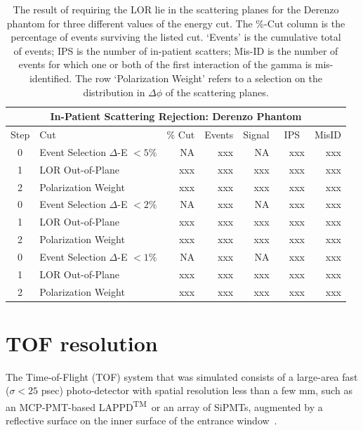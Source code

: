 \documentclass[12pt]{article}
\def\LAPPDTM{LAPPD\textsuperscript{TM}~}
\begin{document}
\begin{table}[h]
\centering
\begin{tabular}{|c|l|r|r|r|r|r|}
\hline\hline
\multicolumn{7}{|c|}{\bf In-Patient Scattering Rejection: Derenzo Phantom}\\
\hline \hline
Step & Cut & $\%$ Cut & Events & Signal & ~IPS~ & MisID \\
\hline
0 & Event Selection  $\Delta$-E $<5\%$ & NA  & xxx & NA  & xxx & xxx \\
1 & LOR Out-of-Plane & xxx & xxx     & xxx & xxx & xxx \\
2 & Polarization Weight & xxx & xxx     & xxx & xxx & xxx \\
\hline
0 & Event Selection  $\Delta$-E $<2\%$ & NA  & xxx & NA  & xxx & xxx \\
1 & LOR Out-of-Plane& xxx & xxx     & xxx & xxx & xxx \\
2 & Polarization Weight & xxx & xxx     & xxx & xxx & xxx \\
\hline
0 & Event Selection  $\Delta$-E $<1\%$ & NA  & xxx & NA  & xxx & xxx \\
1 & LOR Out-of-Plane& xxx & xxx     & xxx & xxx & xxx \\
2 & Polarization Weight & xxx & xxx     & xxx & xxx & xxx \\
\hline\hline
\end{tabular}
 \caption{The result of requiring the LOR lie in the
scattering planes for the Derenzo phantom for three different values of
the energy cut. The \%-Cut column is the percentage of events surviving
the listed cut. `Events' is the cumulative total of events; IPS is the
number of in-patient scatters; Mis-ID is the number of events for which
one or both of the first interaction of the gamma is mis-identified. The row `Polarization Weight' refers to a selection on the distribution in $\Delta\phi$ of the scattering planes.}
\label{tab:IPS}
\end{table}

\section{TOF resolution}
\label{TOF}
The Time-of-Flight (TOF) system that was simulated consists of a large-area fast ($\sigma < 25$ psec) photo-detector with spatial resolution less than a few mm, such as an MCP-PMT-based \LAPPDTM or an array of SiPMTs, augmented by a reflective surface on the inner surface of the entrance window~\cite{PET_NIM_paper}.
\end{document}
